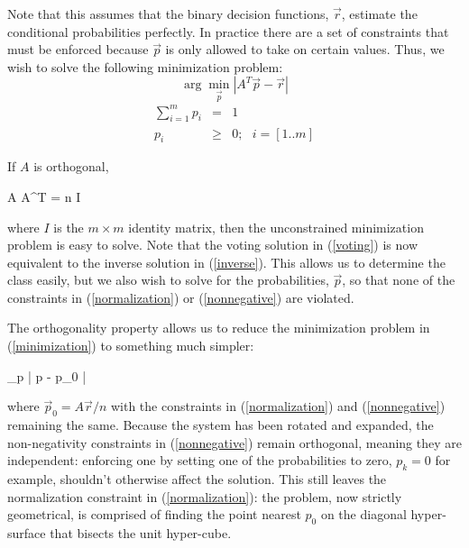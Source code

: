 Note that this assumes that the binary decision functions, $\vec r$,
estimate the conditional probabilities perfectly.
In practice
there are a set of constraints that must be enforced
because $\vec p$ is only allowed to take on certain values.
Thus, we wish to solve the following minimization problem:
\begin{equation}
	\arg \min_{\vec p} | A^T \vec p - \vec r | \label{minimization}
\end{equation}
\begin{eqnarray}
	\sum_{i=1}^m p_i & = & 1 \label{normalization}\\
	p_i & \ge & 0; ~~~ i=[1..m] \label{nonnegative}
\end{eqnarray}

If $A$ is orthogonal,
\begin{eqnnon}
	A A^T = n I
	\label{orthogonal}
\end{eqnnon}
where $I$ is the $m \times m$ identity matrix,
then the unconstrained minimization problem is easy to solve. 
Note that the voting solution in (\ref{voting}) is now equivalent to
the inverse solution in (\ref{inverse}).
This allows us to determine the class easily, but we also wish to solve for
the probabilities, $\vec p$, so that none of the constraints in 
(\ref{normalization}) or (\ref{nonnegative}) are violated.

The orthogonality property allows us to reduce the minimization problem 
in (\ref{minimization}) to something much simpler:
\begin{eqnnon}
	\arg \min_{\vec p} | \vec p - \vec p_0 |
\end{eqnnon}
where $\vec p_0 = A \vec r/n$ with the constraints in (\ref{normalization}) and
(\ref{nonnegative}) remaining the same.
Because the system has been rotated and expanded, the non-negativity 
constraints in (\ref{nonnegative}) remain orthogonal, meaning they are 
independent: enforcing one by setting one of the probabilities to zero, 
$p_k=0$ for example, shouldn't otherwise affect the solution.
This still leaves the normalization constraint in (\ref{normalization}):
the problem, now strictly geometrical, is comprised of finding the point nearest $p_0$ on the diagonal hyper-surface that bisects the unit hyper-cube.

